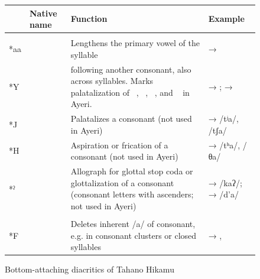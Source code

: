 \begin{figure}
\caption{Bottom-attaching diacritics of Tahano Hikamu}
\begin{tabu} to 
\toprule
\tableheaderfont

	& Native name
	& Function
	& Example
	\\
	
\toprule

\tablesubheaderfont{}\\

\midrule

*aa
	& 
	& Lengthens the primary vowel of the syllable
	&  → 
	\\

\midrule
	
*Y
	& 
	&  following another consonant, also across syllables. Marks 
		palatalization of ~, ~, 
		~, and ~ in Ayeri.
	&  → ;  → 
	\\
	
\midrule
	
*J
	& 
	& Palatalizes a consonant (not used in Ayeri)
	&  →  /tʲa/, /tʃa/
	\\
	
\midrule
	
*H
	& 
	& Aspiration or frication of a consonant (not used in Ayeri)
	&  →  /tʰa/, {/θa/}
	\\
	
\midrule
	
*\hspace{-.25em}ˀ
	& 
	& Allograph for glottal stop coda or glottalization of a 
		consonant (consonant letters with ascenders; not used in Ayeri)
	&  →  /kaʔ/;  →  /d’a/
	\\

\midrule

\tablesubheaderfont{}\\

\midrule

*F
	& 
	& Deletes inherent /a/ of consonant, e.g. in consonant clusters or 
		closed syllables
	&  → , 
	\\
	

\end{tabu}
\end{figure}

